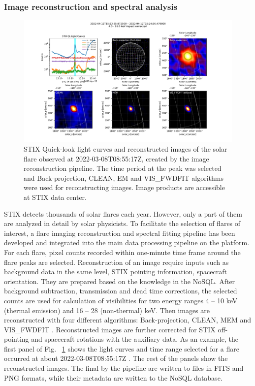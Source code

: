 \documentclass{aa}
\begin{document}
\subsubsection{Image reconstruction and spectral analysis}
\begin{figure}
  \centering
  \includegraphics[width=0.95\linewidth]{figures/imaging_pipeline.pdf}
  \caption{ 
   STIX Quick-look light curves and reconstructed images of the solar flare observed at 2022-03-08T08:55:17Z, 
   created by the image reconstruction pipeline.  The time period at the peak was selected and 
   Back-projection, CLEAN, EM and VIS\_FWDFIT
    algorithms were used for reconstructing images. Image products are accessible
   at STIX data center.}
  \label{fig:imaging}
\end{figure}
STIX detects thousands of  solar flares each year. However, only
 a part of them are analyzed in detail by solar physicists. 
To facilitate the selection of flares of interest, a flare imaging reconstruction and spectral fitting pipeline 
has been developed and integrated into the main data processing pipeline on the platform. 
For each flare, pixel counts recorded within one-minute time frame around the flare peaks  
are selected.
Reconstruction of an image require inputs such as background data in the same level, 
STIX pointing information, spacecraft orientation. 
They are prepared based on the knowledge in the NoSQL. 
After background subtraction, transmission and dead time corrections, the selected counts are used for 
calculation of visibilities for two energy ranges 4 -- 10 keV (thermal emission) and 16 -- 28 (non-thermal)  
keV.
Then images are reconstructed with four different algorithms: Back-projection, CLEAN, 
MEM and VIS\_FWDFIT \cite{paolo2020,clean, mem}.
Reconstructed images are further corrected for STIX off-pointing and spacecraft rotations with the auxiliary data. 
As an example,  the first panel of Fig. ~\ref{fig:imaging} shows 
the light curves and time range selected for a flare occurred at about 2022-03-08T08:55:17Z .
The rest of the panels show the reconstructed images. 
The final by the pipeline are written to files in FITS  and PNG formats, while
their metadata are written to the NoSQL database.  
\end{document}
